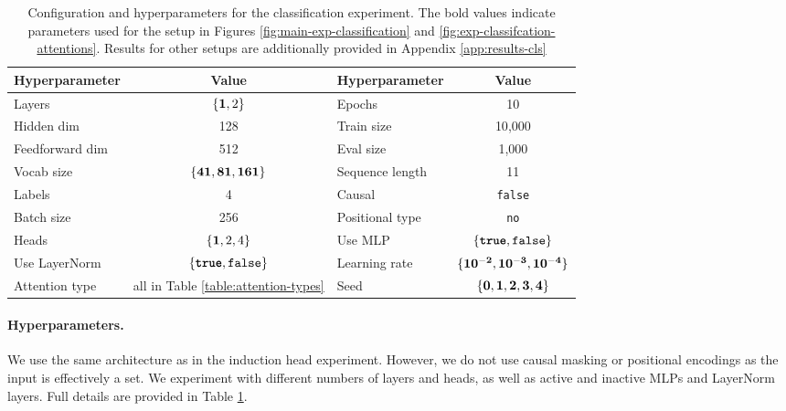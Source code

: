 \documentclass{article}
\theoremstyle{plain}
\theoremstyle{definition}
\theoremstyle{remark}
\begin{document}
\begin{table}[h]
  \centering
  \renewcommand{\arraystretch}{1.15}
  \setlength{\tabcolsep}{10pt}
  \begin{tabular}{l c l c}
    \hline
    \textbf{Hyperparameter} & \textbf{Value} & \textbf{Hyperparameter} & \textbf{Value} \\
    \hline
    Layers           & $\{{\bf1},2\}$ & Epochs         & 10 \\
    Hidden dim       & 128          & Train size     & 10{,}000 \\
    Feedforward dim  & 512          & Eval size      & 1{,}000 \\
    Vocab size       & $\{\bf{41},81,161\}$ & Sequence length & 11 \\
    Labels & 4     & Causal        & \texttt{false} \\
    Batch size       & 256          & Positional type & \texttt{no} \\
    \hline
    Heads            & $\{{\bf 1},2,4\}$ & Use MLP        & $\{\textbf{\texttt{true}},\texttt{false}\}$ \\
    Use LayerNorm    & $\{\textbf{\texttt{true}},\texttt{false}\}$ & Learning rate & $\bf\{10^{-2},10^{-3},10^{-4}\}$ \\
    Attention type   & all in Table \ref{table:attention-types} & Seed & $\bf\{0,1,2,3,4\}$ \\
    \hline
  \end{tabular}
  \vspace{3pt}
  \caption{Configuration and hyperparameters for the classification experiment. The bold values indicate parameters used for the setup in Figures \ref{fig:main-exp-classification} and \ref{fig:exp-classifcation-attentions}. Results for other setups are additionally provided in Appendix \ref{app:results-cls}}
  \label{tab:classification-config-sweep}
\end{table}

\paragraph{Hyperparameters.}

We use the same architecture as in the induction head experiment. However, we do not use causal masking or positional encodings as the input is effectively a set. We experiment with different numbers of layers and heads, as well as active and inactive MLPs and LayerNorm layers. Full details are provided in Table \ref{tab:classification-config-sweep}.
\end{document}
